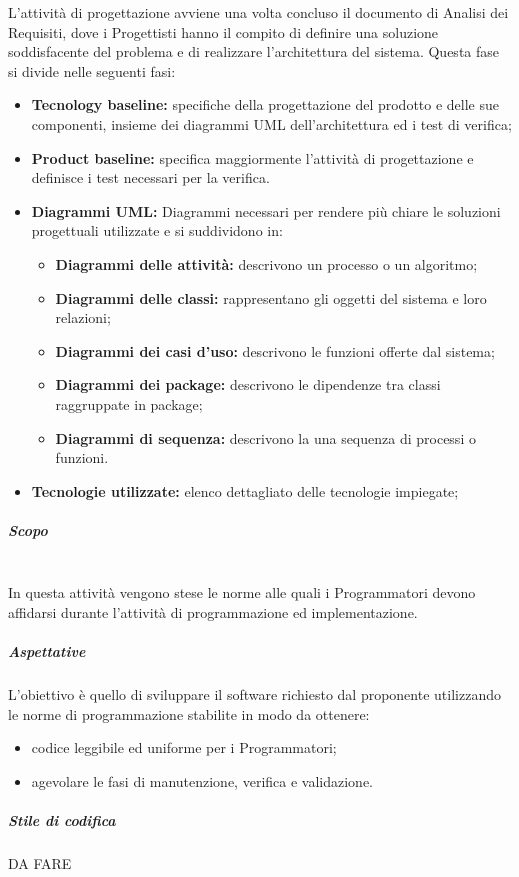 				L'attività di progettazione avviene una volta concluso il documento di Analisi dei Requisiti, dove i Progettisti hanno il compito di definire una soluzione soddisfacente del problema e di realizzare l'architettura del sistema.
				Questa fase si divide nelle seguenti fasi: 
				\begin{itemize}
					\item \textbf{Tecnology baseline:} specifiche della progettazione del prodotto e delle sue componenti, insieme dei diagrammi UML dell'architettura ed i test di verifica;
					\item \textbf{Product baseline:} specifica maggiormente l'attività di progettazione e definisce i test necessari per la verifica. 
					\item \textbf{Diagrammi UML:} Diagrammi necessari per rendere più chiare le soluzioni progettuali utilizzate e si suddividono in:	
					\begin{itemize}
						\item \textbf{Diagrammi delle attività:} descrivono un processo o un algoritmo;
						\item \textbf{Diagrammi delle classi:} rappresentano gli oggetti del sistema e loro relazioni;
						\item \textbf{Diagrammi dei casi d'uso:} descrivono le funzioni offerte dal sistema;
						\item \textbf{Diagrammi dei package:} descrivono le dipendenze tra classi raggruppate in package;
						\item \textbf{Diagrammi di sequenza:} descrivono la una sequenza di processi o funzioni.
					\end{itemize}
					\item \textbf{Tecnologie utilizzate:} elenco dettagliato delle tecnologie impiegate; 
					\end{itemize}	
				
				\subparagraph{Scopo \\ \\}	
					In questa attività vengono stese le norme alle quali i Programmatori devono affidarsi durante l’attività di  programmazione ed implementazione.
				\subparagraph{Aspettative}
					 L’obiettivo è quello di sviluppare il software richiesto dal proponente utilizzando le norme di programmazione stabilite in modo da ottenere:
					 	\begin{itemize}
					 	\item codice leggibile ed uniforme per i Programmatori;
					 	\item agevolare le fasi di manutenzione, verifica e validazione.
					 \end{itemize} 
				 \subparagraph{Stile di codifica}
				 DA FARE
				 

